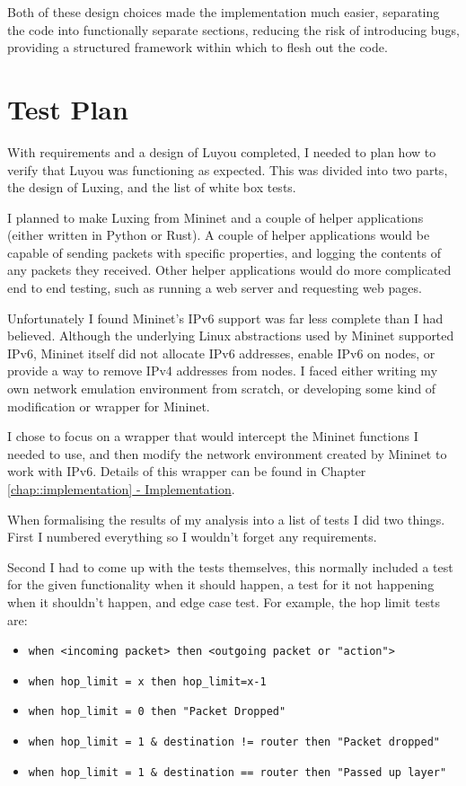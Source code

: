 \documentclass[12pt,a4paper,twoside,openany]{report}
\begin{document}
\bigskip

Both of these design choices made the implementation much easier, separating the code into functionally separate sections, reducing the risk of introducing bugs, providing a structured framework within which to flesh out the code.

\section{Test Plan}
\label{sec::test_plan}

With requirements and a design of Luyou completed, I needed to plan how to verify that Luyou was functioning as expected.  This was divided into two parts, the design of Luxing, and the list of white box tests.

\bigskip

I planned to make Luxing from Mininet and a couple of helper applications (either written in Python or Rust).  A couple of helper applications would be capable of sending packets with specific properties, and logging the contents of any packets they received. Other helper applications would do more complicated end to end testing, such as running a web server and requesting web pages.  

Unfortunately I found Mininet's IPv6 support was far less complete than I had believed. Although the underlying Linux abstractions used by Mininet supported IPv6, Mininet itself did not allocate IPv6 addresses, enable IPv6 on nodes, or provide a way to remove IPv4 addresses from nodes.  I faced either writing my own network emulation environment from scratch, or developing some kind of modification or wrapper for Mininet.  

I chose to focus on a wrapper that would intercept the Mininet functions I needed to use, and then modify the network environment created by Mininet to work with IPv6. Details of this wrapper can be found in Chapter \ref{chap::implementation}\hyperref[chap::implementation]{ - Implementation}.

\bigskip

When formalising the results of my analysis into a list of tests I did two things. First I  numbered everything so I wouldn't forget any requirements.  

Second I had to come up with the tests themselves, this normally included a test for the given functionality when it should happen, a test for it not happening when it shouldn't happen, and edge case test.  For example, the hop limit tests are:
\begin{itemize}
\item \verb!when <incoming packet> then <outgoing packet or "action">!
\item \verb!when hop_limit = x then hop_limit=x-1!
\item \verb!when hop_limit = 0 then "Packet Dropped"!
\item \verb+when hop_limit = 1 & destination != router then "Packet dropped" +
\item \verb!when hop_limit = 1 & destination == router then "Passed up layer"!
\end{itemize}
\end{document}
